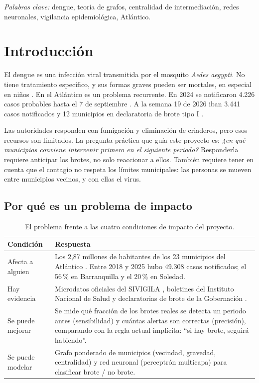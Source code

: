 \documentclass[11pt,letterpaper]{article}
\begin{document}
\medskip\noindent
\emph{Palabras clave:} dengue, teoría de grafos, centralidad de intermediación, redes neuronales, vigilancia epidemiológica, Atlántico.

\newpage
\section{Introducción}

El dengue es una infección viral transmitida por el mosquito \emph{Aedes aegypti}. No tiene tratamiento específico, y sus formas graves pueden ser mortales, en especial en niños \citep{oms_dengue}. En el Atlántico es un problema recurrente. En 2024 se notificaron 4.226 casos probables hasta el 7 de septiembre \citep{eltiempo2024}. A la semana 19 de 2026 iban 3.441 casos notificados y 12 municipios en declaratoria de brote tipo I \citep{eluniversal2026}.

Las autoridades responden con fumigación y eliminación de criaderos, pero esos recursos son limitados. La pregunta práctica que guía este proyecto es: \emph{¿en qué municipios conviene intervenir primero en el siguiente periodo?} Responderla requiere anticipar los brotes, no solo reaccionar a ellos. También requiere tener en cuenta que el contagio no respeta los límites municipales: las personas se mueven entre municipios vecinos, y con ellas el virus.

\subsection{Por qué es un problema de impacto}

\begin{table}[H]
\centering\small
\caption{El problema frente a las cuatro condiciones de impacto del proyecto.}
\label{tab:impacto}
\begin{tabularx}{\textwidth}{@{}lX@{}}
\toprule
Condición & Respuesta \\
\midrule
Afecta a alguien & Los 2,87 millones de habitantes de los 23 municipios del Atlántico \citep{dane_pob}. Entre 2018 y 2025 hubo 49.308 casos notificados; el 56\,\% en Barranquilla y el 20\,\% en Soledad. \\
Hay evidencia & Microdatos oficiales del SIVIGILA \citep{sivigila}, boletines del Instituto Nacional de Salud y declaratorias de brote de la Gobernación \citep{eluniversal2026}. \\
Se puede mejorar & Se mide qué fracción de los brotes reales se detecta un periodo antes (sensibilidad) y cuántas alertas son correctas (precisión), comparando con la regla actual implícita: ``si hay brote, seguirá habiendo''. \\
Se puede modelar & Grafo ponderado de municipios (vecindad, gravedad, centralidad) y red neuronal (perceptrón multicapa) para clasificar brote / no brote. \\
\bottomrule
\end{tabularx}
\end{table}
\end{document}
